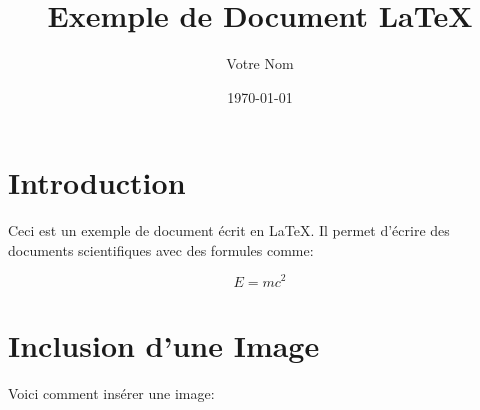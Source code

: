 \documentclass{article}
\begin{document}
\title{Exemple de Document \LaTeX}
\author{Votre Nom}
\date{\today}

\maketitle

\section{Introduction}

Ceci est un exemple de document écrit en \LaTeX. Il permet d'écrire des documents scientifiques avec des formules comme:

\begin{equation}
    E = mc^2
\end{equation}

\section{Inclusion d'une Image}

Voici comment insérer une image:
\end{document}
